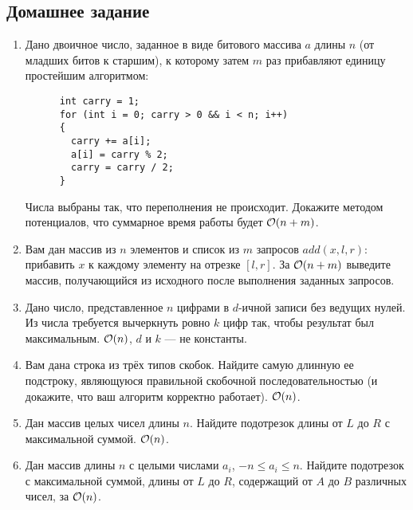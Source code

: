\subsection{Домашнее задание}
\begin{enumerate}

  \item
    Дано двоичное число, заданное в виде битового массива $a$ длины $n$ (от младших битов к старшим), к которому
    затем $m$ раз прибавляют единицу простейшим алгоритмом:
    \begin{lstlisting}
      int carry = 1;
      for (int i = 0; carry > 0 && i < n; i++)
      {
        carry += a[i];
        a[i] = carry % 2;
        carry = carry / 2;
      }
    \end{lstlisting}
    Числа выбраны так, что переполнения не происходит. Докажите методом потенциалов, что суммарное время
    работы будет $\mathcal{O}(n + m)$.

  \item
    Вам дан массив из $n$ элементов и
    список из $m$ запросов $add(x, l, r)$: прибавить $x$ к каждому
    элементу на отрезке $[l, r]$. За $\mathcal{O}(n + m)$ выведите массив,
    получающийся из исходного после выполнения заданных запросов.

  \item
    Дано число, представленное $n$ цифрами в $d$-ичной записи без
    ведущих нулей.  Из числа требуется вычеркнуть ровно $k$ цифр так,
    чтобы результат был максимальным. $\mathcal{O}(n)$, $d$ и $k$ --- не константы.
    
  \item {}
    Вам дана строка из трёх типов скобок. Найдите самую длинную ее
    подстроку, являющуюся правильной скобочной последовательностью
    (и докажите, что ваш алгоритм корректно работает). $\mathcal{O}(n)$.

  \item
    Дан массив целых чисел длины $n$. Найдите подотрезок длины
    от $L$ до $R$ с максимальной суммой. $\mathcal{O}(n)$.

  \item {}
    Дан массив длины $n$ с целыми числами $a_i$, $-n \leq a_i \leq n$.
    Найдите подотрезок с максимальной суммой, длины от $L$ до $R$,
    содержащий от $A$ до $B$ различных чисел, за $\mathcal{O}(n)$.
    

\end{enumerate}
